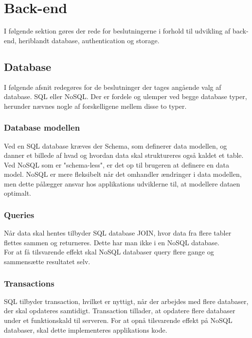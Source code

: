 \section{Back-end}
I følgende sektion gøres der rede for beslutningerne i forhold til udvikling af back-end, heriblandt database, authentication og storage.

\subsection{Database}
I følgende afsnit redegøres for de beslutninger der tages angående valg af database. SQL\cite{SQL} eller NoSQL\cite{NoSQL}.
Der er fordele og ulemper ved begge database typer, herunder nævnes nogle af forskelligene mellem disse to typer.

\subsubsection{Database modellen}

Ved en SQL database kræves der Schema\cite{Schema}, som definerer data modellen, og danner et billede af hvad og hvordan data skal struktureres også kaldet et table. Ved NoSQL som er "schema-less", er det op til brugeren at definere en data model. NoSQL er mere fleksibelt når det omhandler ændringer i data modellen, men dette pålægger ansvar hos applikations udviklerne til, at modellere dataen optimalt.

\subsubsection{Queries\cite{Query}}
Når data skal hentes tilbyder SQL database JOIN\cite{JOIN}, hvor data fra flere tabler flettes sammen og returneres. Dette har man ikke i en NoSQL database. \\
For at få tilsvarende effekt skal NoSQL databaser query flere gange og sammensætte resultatet selv.

\subsubsection{Transactions\cite{Transactions}}
 SQL tilbyder transaction, hvilket er nyttigt, når der arbejdes med flere databaser, der skal opdateres samtidigt. Transaction tillader, at opdatere flere databaser under et funktionskald til serveren. For at opnå tilsvarende effekt på NoSQL databaser, skal dette implementeres applikations kode. 

